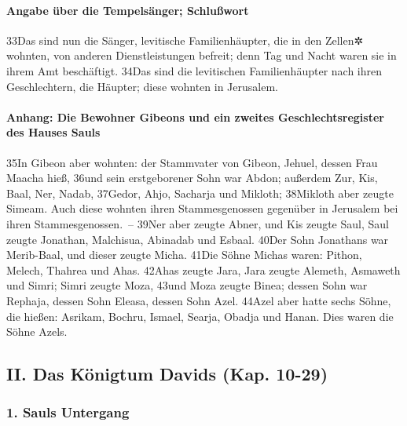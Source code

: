 \hypertarget{angabe-uxfcber-die-tempelsuxe4nger-schluuxdfwort}{%
\paragraph{Angabe über die Tempelsänger;
Schlußwort}\label{angabe-uxfcber-die-tempelsuxe4nger-schluuxdfwort}}

33Das sind nun die Sänger, levitische Familienhäupter, die in den
Zellen✲ wohnten, von anderen Dienstleistungen befreit; denn Tag und
Nacht waren sie in ihrem Amt beschäftigt. 34Das sind die levitischen
Familienhäupter nach ihren Geschlechtern, die Häupter; diese wohnten in
Jerusalem.

\hypertarget{anhang-die-bewohner-gibeons-und-ein-zweites-geschlechtsregister-des-hauses-sauls}{%
\paragraph{Anhang: Die Bewohner Gibeons und ein zweites
Geschlechtsregister des Hauses
Sauls}\label{anhang-die-bewohner-gibeons-und-ein-zweites-geschlechtsregister-des-hauses-sauls}}

35In Gibeon aber wohnten: der Stammvater von Gibeon, Jehuel, dessen Frau
Maacha hieß, 36und sein erstgeborener Sohn war Abdon; außerdem Zur, Kis,
Baal, Ner, Nadab, 37Gedor, Ahjo, Sacharja und Mikloth; 38Mikloth aber
zeugte Simeam. Auch diese wohnten ihren Stammesgenossen gegenüber in
Jerusalem bei ihren Stammesgenossen.~-- 39Ner aber zeugte Abner, und Kis
zeugte Saul, Saul zeugte Jonathan, Malchisua, Abinadab und Esbaal. 40Der
Sohn Jonathans war Merib-Baal, und dieser zeugte Micha. 41Die Söhne
Michas waren: Pithon, Melech, Thahrea und Ahas. 42Ahas zeugte Jara, Jara
zeugte Alemeth, Asmaweth und Simri; Simri zeugte Moza, 43und Moza zeugte
Binea; dessen Sohn war Rephaja, dessen Sohn Eleasa, dessen Sohn Azel.
44Azel aber hatte sechs Söhne, die hießen: Asrikam, Bochru, Ismael,
Searja, Obadja und Hanan. Dies waren die Söhne Azels.

\hypertarget{ii.-das-kuxf6nigtum-davids-kap.-10-29}{%
\subsection{II. Das Königtum Davids (Kap.
10-29)}\label{ii.-das-kuxf6nigtum-davids-kap.-10-29}}

\hypertarget{sauls-untergang}{%
\subsubsection{1. Sauls Untergang}\label{sauls-untergang}}

